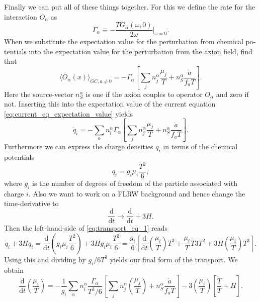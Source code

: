 \documentclass[master,       %
               twoside,        %
               BCOR10mm,       %
               english,ngerman, %
               ]{GAUBM}
\begin{document}
\begin{otherlanguage}{english}
Finally we can put all of these things together.
For this we define the rate for the interaction $O_\alpha$ as 
\begin{equation}
	\Gamma_\alpha \equiv - \frac{T G_\alpha(\omega, 0)}{2\omega} \Big|_{\omega = 0}.
\end{equation} 
When we substitute the expectation value for the perturbation from chemical potentials into the expectation value for the perturbation from the axion field, find that
\begin{equation}
	\langle O_\alpha(x) \rangle_{GC, a \ne 0} = - \Gamma_\alpha \left[ \sum_j n_j^\alpha \frac{\mu_j}{T} + n_S^\alpha \frac{\dot{a}}{f_a T} \right].
\end{equation}
Here the source-vector $n_S^\alpha$ is one if the axion couples to operator $O_\alpha$ and zero if not. 
Inserting this into the expectation value of the current equation \eqref{eq:current_eq_expectation_value} yields 
\begin{equation}
	\label{eq:transport_eq_1}
	\dot{q}_i = - \sum_\alpha n^\alpha_i \Gamma_\alpha \left[ \sum_j n_j^\alpha \frac{\mu_j}{T} + n_S^\alpha \frac{\dot{a}}{f_a T} \right].
\end{equation}
Furthermore we can express the charge densities $q_i$ in terms of the chemical potentials
\begin{equation}
	q_i = g_i \mu_i \frac{T^2}{6},
\end{equation}
where $g_i$ is the number of degrees of freedom of the particle associated with charge $i$.
Also we want to work on a FLRW background and hence change the time-derivative to
\begin{equation}
	\frac{\mathrm{d}}{\mathrm{d} t} \to \frac{\mathrm{d}}{\mathrm{d} t} + 3 H.
\end{equation}
Then the left-hand-side of \eqref{eq:transport_eq_1} reads
\begin{equation}
	\dot{q}_i + 3 H q_i = \frac{\mathrm{d}}{\mathrm{d} t} \left( g_i \mu_i \frac{T^2}{6} \right) + 3 H g_i \mu_i \frac{T^2}{6} = \frac{g_i}{6} \left[ \frac{\mathrm{d}}{\mathrm{d} t} \left( \frac{\mu_i}{T} \right) T^3 + \frac{\mu_i}{T} \dot{T} 3 T^2 + 3 H \left( \frac{\mu_i}{T} \right) T^3 \right].
\end{equation}
Using this and dividing by $g_i / 6 T^3$ yields our final form of the transport. We obtain
\begin{equation}
	\boxed{
	\frac{\mathrm{d}}{\mathrm{d} t} \left( \frac{\mu_i}{T} \right) = - \frac{1}{g_i} \sum_\alpha n^\alpha_i \frac{\Gamma_\alpha}{T^3 / 6} \left[ \sum_j n_j^\alpha \left( \frac{\mu_j}{T} \right) + n_S^\alpha \frac{\dot{a}}{f_a T} \right] - 3 \left( \frac{\mu_i}{T} \right) \left[ \frac{\dot{T}}{T} + H \right].
	}
\end{equation}



\end{otherlanguage}
\end{document}
